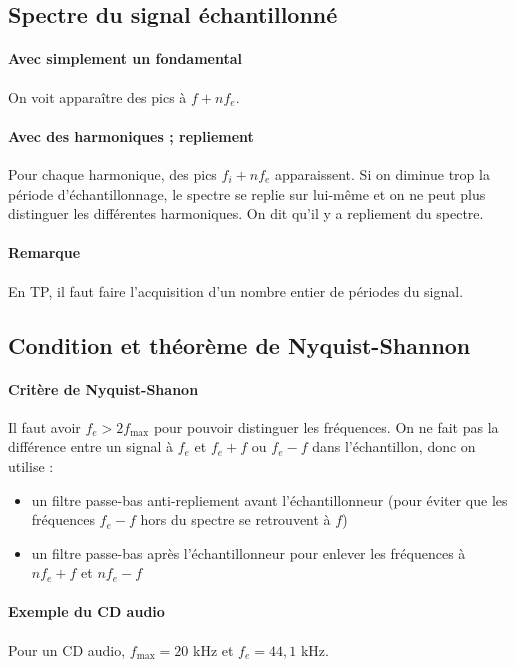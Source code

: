 \documentclass[french]{book}
\theoremstyle{plain}
\theoremstyle{definition}
\theoremstyle{remark}
\begin{document}
\subsection{Spectre du signal échantillonné}

\paragraph{Avec simplement un fondamental} On voit apparaître des pics à $f+nf_e$.

\paragraph{Avec des harmoniques ; repliement} Pour chaque harmonique, des pics $f_i+nf_e$ apparaissent. Si on diminue trop la période d'échantillonnage, le spectre se replie sur lui-même et on ne peut plus distinguer les différentes harmoniques. On dit qu'il y a repliement du spectre.

\paragraph{Remarque} En TP, il faut faire l'acquisition d'un nombre entier de périodes du signal.

\subsection{Condition et théorème de Nyquist-Shannon}

\paragraph{Critère de Nyquist-Shanon} Il faut avoir $f_e>2f_\text{max}$ pour pouvoir distinguer les fréquences. On ne fait pas la différence entre un signal à $f_e$ et $f_e+f$ ou $f_e-f$ dans l'échantillon, donc on utilise :
\begin{itemize}
	\item un filtre passe-bas anti-repliement avant l'échantillonneur (pour éviter que les fréquences $f_e-f$ hors du spectre se retrouvent à $f$)
	\item un filtre passe-bas après l'échantillonneur pour enlever les fréquences à $nf_e+f$ et $nf_e-f$
\end{itemize}

\paragraph{Exemple du CD audio} Pour un CD audio, $f_\text{max}=20$ kHz et $f_e=44,1$ kHz.
\end{document}
